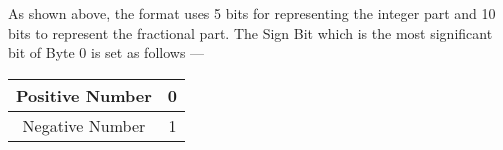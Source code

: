 As shown above, the format uses 5 bits for representing the integer part and 10 bits to represent the
fractional part. The Sign Bit which is the most significant bit of Byte 0 is set as follows ---

\begin{table}[H]
\centering
\begin{tabular}{|c|c|}
\hline
Positive Number & 0 \\
\hline
Negative Number & 1 \\
\hline
\end{tabular}
\end{table}

